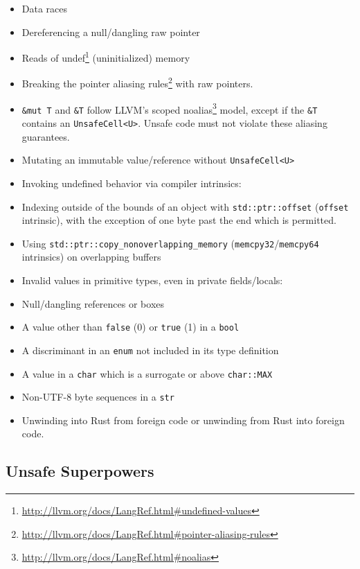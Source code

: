 \documentclass[a4paper,]{book}
\renewcommand{\href}[2]{#2\footnote{\url{#1}}}
\begin{document}
\begin{itemize}
\itemsep1pt\parskip0pt
\item
  Data races
\item
  Dereferencing a null/dangling raw pointer
\item
  Reads of
  \href{http://llvm.org/docs/LangRef.html\#undefined-values}{undef}
  (uninitialized) memory
\item
  Breaking the
  \href{http://llvm.org/docs/LangRef.html\#pointer-aliasing-rules}{pointer
  aliasing rules} with raw pointers.
\item
  \texttt{\&mut\ T} and \texttt{\&T} follow LLVM's scoped
  \href{http://llvm.org/docs/LangRef.html\#noalias}{noalias} model,
  except if the \texttt{\&T} contains an
  \texttt{UnsafeCell\textless{}U\textgreater{}}. Unsafe code must not
  violate these aliasing guarantees.
\item
  Mutating an immutable value/reference without
  \texttt{UnsafeCell\textless{}U\textgreater{}}
\item
  Invoking undefined behavior via compiler intrinsics:
\item
  Indexing outside of the bounds of an object with
  \texttt{std::ptr::offset} (\texttt{offset} intrinsic), with the
  exception of one byte past the end which is permitted.
\item
  Using \texttt{std::ptr::copy\_nonoverlapping\_memory}
  (\texttt{memcpy32}/\texttt{memcpy64} intrinsics) on overlapping
  buffers
\item
  Invalid values in primitive types, even in private fields/locals:
\item
  Null/dangling references or boxes
\item
  A value other than \texttt{false} (0) or \texttt{true} (1) in a
  \texttt{bool}
\item
  A discriminant in an \texttt{enum} not included in its type definition
\item
  A value in a \texttt{char} which is a surrogate or above
  \texttt{char::MAX}
\item
  Non-UTF-8 byte sequences in a \texttt{str}
\item
  Unwinding into Rust from foreign code or unwinding from Rust into
  foreign code.
\end{itemize}

\subsection{Unsafe Superpowers}\label{unsafe-superpowers}
\end{document}
